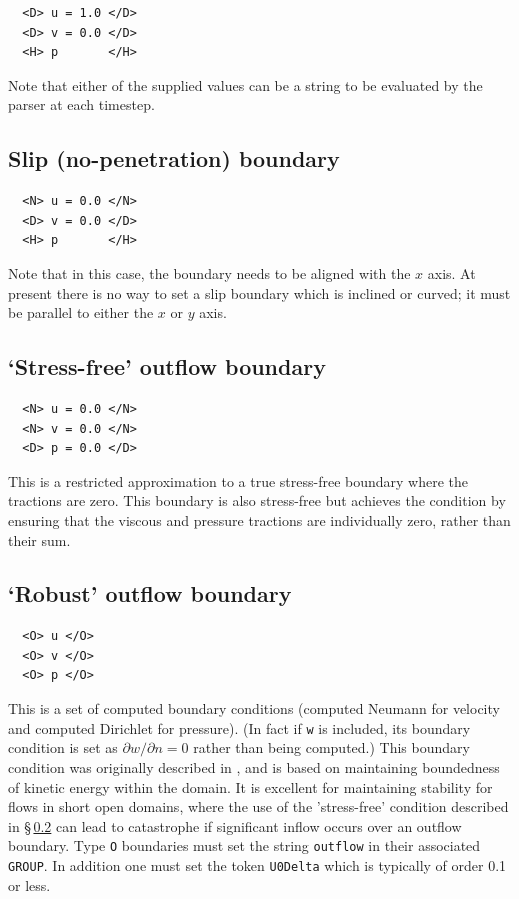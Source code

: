 \documentclass[11pt]{report}
\begin{document}
{\small
\begin{verbatim}
  <D> u = 1.0 </D>
  <D> v = 0.0 </D>
  <H> p       </H>
\end{verbatim}
}
\noindent Note that either of the supplied values can be a string to
be evaluated by the parser at each timestep.

\subsection{Slip (no-penetration) boundary}

{\small
\begin{verbatim}
  <N> u = 0.0 </N>
  <D> v = 0.0 </D>
  <H> p       </H>
\end{verbatim}
}
\noindent Note that in this case, the boundary needs to be aligned
with the $x$ axis.  At present there is no way to set a slip boundary
which is inclined or curved; it must be parallel to either the $x$ or
$y$ axis.

\subsection{`Stress-free' outflow boundary}
\label{sec.stressfree}

{\small
\begin{verbatim}
  <N> u = 0.0 </N>
  <N> v = 0.0 </N>
  <D> p = 0.0 </D>
\end{verbatim}
}
\noindent This is a restricted approximation to a true stress-free
boundary where the tractions are zero. This boundary is also
stress-free but achieves the condition by ensuring that the viscous
and pressure tractions are individually zero, rather than their sum.

\subsection{`Robust' outflow boundary}
\label{sec.robust}

{\small
\begin{verbatim}
  <O> u </O>
  <O> v </O>
  <O> p </O>
\end{verbatim}
}
\noindent This is a set of computed boundary conditions (computed
Neumann for velocity and computed Dirichlet for pressure).  (In fact
if \verb+w+ is included, its boundary condition is set as $\partial
w/\partial n=0$ rather than being computed.) This boundary condition
was originally described in \citet{dkc14}, and is based on maintaining
boundedness of kinetic energy within the domain.  It is excellent for
maintaining stability for flows in short open domains, where the use
of the 'stress-free' condition described in \S\,\ref{sec.stressfree}
can lead to catastrophe if significant inflow occurs over an outflow
boundary.  Type \verb|O| boundaries must set the string \verb|outflow|
in their associated \verb|GROUP|.  In addition one must set the token
\verb+U0Delta+ \citep[see eq.\ 4 of][this is $U_o\delta$]{dkc14}
which is typically of order 0.1 or less.
\end{document}
